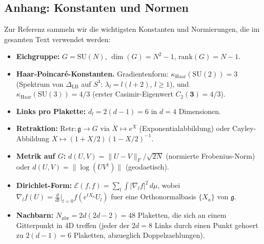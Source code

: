 \documentclass[12pt,a4paper]{article}
\theoremstyle{definition}
\theoremstyle{plain}
\theoremstyle{remark}
\begin{document}
\subsection*{Anhang: Konstanten und Normen}
\label{app:constants}

Zur Referenz sammeln wir die wichtigsten Konstanten und Normierungen, die im gesamten Text verwendet werden:

\begin{itemize}
\item \textbf{Eichgruppe:} $G = \mathrm{SU}(N)$, $\dim(G) = N^2 - 1$, $\mathrm{rank}(G) = N-1$.
\item \textbf{Haar-Poincar\'e-Konstanten.}
Gradientenform:
$\kappa_{\mathrm{Haar}}(\mathrm{SU}(2)) = 3$
(Spektrum von $\Delta_{\mathrm{LB}}$ auf $S^3$:
$\lambda_l = l(l+2)$, $l \geq 1$), und
$\kappa_{\mathrm{Haar}}(\mathrm{SU}(3)) = 4/3$
(erster Casimir-Eigenwert $C_2(\mathbf{3}) = 4/3$).
\item \textbf{Links pro Plakette:} $d_l = 2(d-1) = 6$ in $d = 4$ Dimensionen.
\item \textbf{Retraktion:} $\mathrm{Retr}: \mathfrak{g} \to G$ via $X \mapsto e^X$ (Exponentialabbildung) oder Cayley-Abbildung $X \mapsto (1 + X/2)(1 - X/2)^{-1}$.
\item \textbf{Metrik auf $G$:} $d(U, V) = \|U - V\|_F / \sqrt{2N}$ (normierte Frobenius-Norm) oder $d(U, V) = \|\log(U V^\dagger)\|$ (geodaetisch).
\item \textbf{Dirichlet-Form:} $\mathcal{E}(f, f) = \sum_l \int |\nabla_l f|^2 \, d\mu$, wobei $\nabla_l f(U) = \frac{d}{dt}\big|_{t=0} f(e^{tX_a} U_l)$ fuer eine Orthonormalbasis $\{X_a\}$ von $\mathfrak{g}$.
\item \textbf{Nachbarn:} $N_{\mathrm{nbr}} = 2d(2d - 2) = 48$ Plaketten, die sich an einem Gitterpunkt in 4D treffen (jeder der $2d = 8$ Links durch einen Punkt gehoert zu $2(d-1) = 6$ Plaketten, abzueglich Doppelzaehlungen).
\end{itemize}
\end{document}
